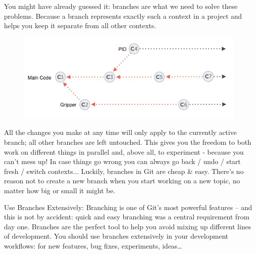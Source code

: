 \documentclass{article}
\begin{document}
You might have already guessed it: branches are what we need to solve these problems. Because a branch represents exactly such a context in a project and helps you keep it separate from all other contexts.

\begin{figure}[h]
    \centering
    \includegraphics[width=4.5in]{images/multiple-contexts.jpg}
\end{figure}

All the changes you make at any time will only apply to the currently active branch; all other branches are left untouched. This gives you the freedom to both work on different things in parallel and, above all, to experiment - because you can't mess up! In case things go wrong you can always go back / undo / start fresh / switch contexts...
\newline\newline
Luckily, branches in Git are cheap \& easy. There's no reason not to create a new branch when you start working on a new topic, no matter how big or small it might be.

\begin{golden-rule}
Use Branches Extensively:
\newline\newline
Branching is one of Git’s most powerful features – and this is not by accident: quick and easy branching was a central requirement from day one. Branches are the perfect tool to help you avoid mixing up different lines of development. You should use branches extensively in your development workflows: for new features, bug fixes, experiments, ideas…
\end{golden-rule}
\end{document}
